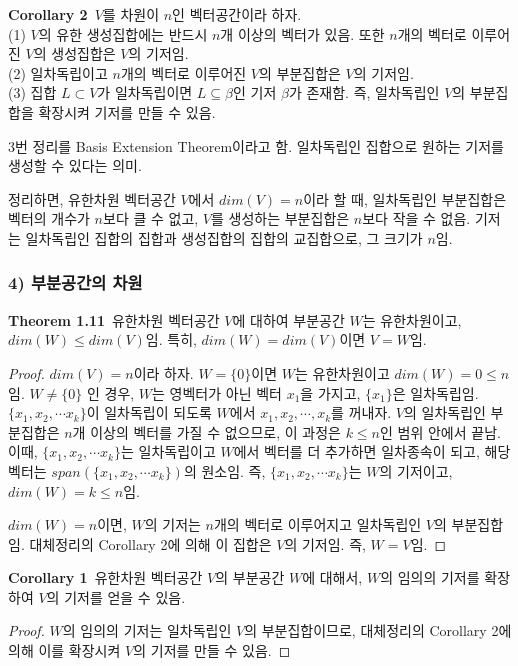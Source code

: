 \textbf{Corollary 2}\, $V$를 차원이 $n$인 벡터공간이라 하자.\\
(1) $V$의 유한 생성집합에는 반드시 $n$개 이상의 벡터가 있음. 또한 $n$개의 벡터로 이루어진 $V$의 생성집합은 $V$의 기저임.\\
(2) 일차독립이고 $n$개의 벡터로 이루어진 $V$의 부분집합은 $V$의 기저임.\\
(3) 집합 $L \subset V$가 일차독립이면 $L \subseteq \beta$인 기저 $\beta$가 존재함. 즉, 일차독립인 $V$의 부분집합을 확장시켜 기저를 만들 수 있음.

3번 정리를 Basis Extension Theorem이라고 함. 일차독립인 집합으로 원하는 기저를 생성할 수 있다는 의미.

정리하면, 유한차원 벡터공간 $V$에서 $dim(V)=n$이라 할 때, 일차독립인 부분집합은 벡터의 개수가 $n$보다 클 수 없고, $V$를 생성하는 부분집합은 $n$보다 작을 수 없음. 기저는 일차독립인 집합의 집합과 생성집합의 집합의 교집합으로, 그 크기가 $n$임.


\newpage


\subsubsection*{4) 부분공간의 차원}
\textbf{Theorem 1.11}\, 유한차원 벡터공간 $V$에 대하여 부분공간 $W$는 유한차원이고, $dim(W) \leq dim(V)$임. 특히, $dim(W) = dim(V)$이면 $V=W$임.

\begin{proof}
$dim(V)=n$이라 하자. $W=\{0\}$이면 $W$는 유한차원이고 $dim(W)=0 \leq n$임. $W \neq \{0\}$ 인 경우, $W$는 영벡터가 아닌 벡터 $x_1$을 가지고, $\{x_1\}$은 일차독립임. $\{x_1,x_2, \cdots x_k\}$이 일차독립이 되도록 $W$에서 $x_1,x_2, \cdots ,x_k$를 꺼내자. $V$의 일차독립인 부분집합은 $n$개 이상의 벡터를 가질 수 없으므로, 이 과정은 $k \leq n$인 범위 안에서 끝남. 이때, $\{x_1,x_2, \cdots x_k\}$는 일차독립이고 $W$에서 벡터를 더 추가하면 일차종속이 되고, 해당 벡터는 $span(\{x_1,x_2, \cdots x_k\})$의 원소임. 즉, $\{x_1,x_2, \cdots x_k\}$는 $W$의 기저이고, $dim(W)=k \leq n$임.

$dim(W)=n$이면, $W$의 기저는 $n$개의 벡터로 이루어지고 일차독립인 $V$의 부분집합임. 대체정리의 Corollary 2에 의해 이 집합은 $V$의 기저임. 즉, $W=V$임.
\end{proof}

\textbf{Corollary 1}\, 유한차원 벡터공간 $V$의 부분공간 $W$에 대해서, $W$의 임의의 기저를 확장하여 $V$의 기저를 얻을 수 있음.

\begin{proof}
$W$의 임의의 기저는 일차독립인 $V$의 부분집합이므로, 대체정리의 Corollary 2에 의해 이를 확장시켜 $V$의 기저를 만들 수 있음.
\end{proof}


\newpage
